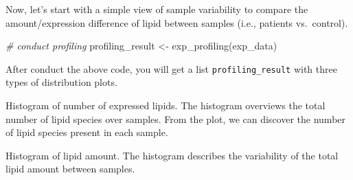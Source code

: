 \documentclass[]{article}
\newcommand{\hlstr}[1]{\textcolor[rgb]{0.251,0.627,0.251}{#1}}%
\newcommand{\hlcom}[1]{\textcolor[rgb]{0.502,0.502,0.502}{\textit{#1}}}%
\newcommand{\hlopt}[1]{\textcolor[rgb]{0,0,0}{#1}}%
\newcommand{\hlstd}[1]{\textcolor[rgb]{0.251,0.251,0.251}{#1}}%
\newcommand{\hlkwd}[1]{\textcolor[rgb]{0.878,0.439,0.125}{#1}}%
\newenvironment{Shaded}{\begin{myshaded}}{\end{myshaded}}
\newcommand{\KeywordTok}[1]{\hlkwd{#1}}
\newcommand{\StringTok}[1]{\hlstr{#1}}
\newcommand{\CommentTok}[1]{\hlcom{#1}}
\newcommand{\OperatorTok}[1]{\hlopt{#1}}
\newcommand{\NormalTok}[1]{\hlstd{#1}}
\begin{document}
Now, let's start with a simple view of sample variability to compare the amount/expression difference of lipid between samples (i.e., patients vs.~control).

\begin{Shaded}
\begin{Highlighting}[]
\CommentTok{# conduct profiling}
\NormalTok{profiling_result <-}\StringTok{ }\KeywordTok{exp_profiling}\NormalTok{(exp_data)}
\end{Highlighting}
\end{Shaded}

After conduct the above code, you will get a list \texttt{profiling\_result} with three types of distribution plots.

\begin{Shaded}
\end{Shaded}

\label{fig:unnamed-chunk-3}Histogram of number of expressed lipids. The histogram overviews the total number of lipid species over samples. From the plot, we can discover the number of lipid species present in each sample.

\begin{Shaded}
\end{Shaded}

\label{fig:unnamed-chunk-4}Histogram of lipid amount. The histogram describes the variability of the total lipid amount between samples.

\begin{Shaded}
\end{Shaded}
\end{document}
